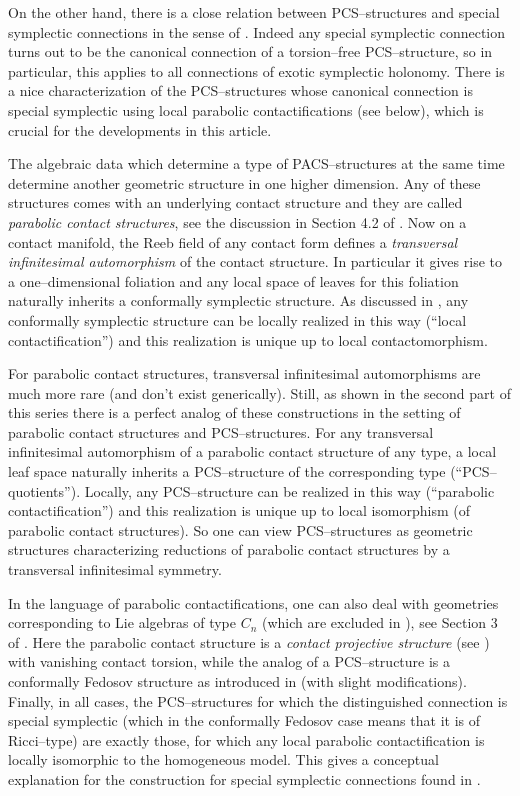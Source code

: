 \documentclass[12pt,a4paper]{amsart}
\numberwithin{theorem}{section}
\theoremstyle{definition}
\theoremstyle{remark}
\begin{document}
On the other hand, there is a close relation between PCS--structures
and special symplectic connections in the sense of
\cite{Cahen-Schwachhoefer}. Indeed any special symplectic connection
turns out to be the canonical connection of a torsion--free
PCS--structure, so in particular, this applies to all connections of
exotic symplectic holonomy. There is a nice characterization of the
PCS--structures whose canonical connection is special symplectic using
local parabolic contactifications (see below), which is crucial for
the developments in this article. 

\smallskip

The algebraic data which determine a type of PACS--structures at the
same time determine another geometric structure in one higher
dimension. Any of these structures comes with an underlying contact
structure and they are called \textit{parabolic contact structures},
see the discussion in Section 4.2 of \cite{book}. Now on a contact
manifold, the Reeb field of any contact form defines a
\textit{transversal infinitesimal automorphism} of the contact
structure. In particular it gives rise to a one--dimensional foliation
and any local space of leaves for this foliation naturally inherits a
conformally symplectic structure. As discussed in \cite{Cap-Salac},
any conformally symplectic structure can be locally realized in this
way (``local contactification'') and this realization is unique up to
local contactomorphism. 

For parabolic contact structures, transversal infinitesimal
automorphisms are much more rare (and don't exist generically). Still, 
as shown in the second part \cite{PCS2} of this series there is a
perfect analog of these constructions in the setting of parabolic
contact structures and PCS--structures. For any transversal
infinitesimal automorphism of a parabolic contact structure of any
type, a local leaf space naturally inherits a PCS--structure of the
corresponding type (``PCS--quotients''). Locally, any PCS--structure
can be realized in this way (``parabolic contactification'') and this
realization is unique up to local isomorphism (of parabolic contact
structures). So one can view PCS--structures as geometric structures
characterizing reductions of parabolic contact structures by a
transversal infinitesimal symmetry. 

In the language of parabolic contactifications, one can also deal with
geometries corresponding to Lie algebras of type $C_n$ (which are
excluded in \cite{PCS1}), see Section 3 of \cite{PCS2}. Here the
parabolic contact structure is a \textit{contact projective structure}
(see \cite{Fox}) with vanishing contact torsion, while the analog of a
PCS--structure is a conformally Fedosov structure as introduced in
\cite{E-S} (with slight modifications). Finally, in all cases, the
PCS--structures for which the distinguished connection is special
symplectic (which in the conformally Fedosov case means that it is of
Ricci--type) are exactly those, for which any local parabolic
contactification is locally isomorphic to the homogeneous model. This
gives a conceptual explanation for the construction for special
symplectic connections found in \cite{Cahen-Schwachhoefer}.
\end{document}
